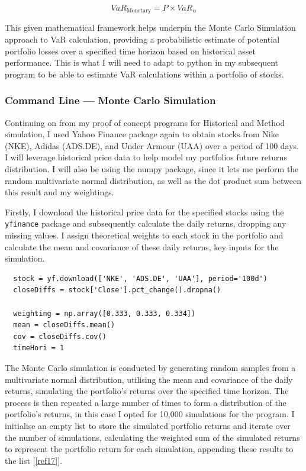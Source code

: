 \documentclass{article}
\begin{document}
\begin{equation}
    VaR_{\text{Monetary}} = P \times VaR_\alpha
\end{equation}

This given mathematical framework helps underpin the Monte Carlo Simulation approach to VaR calculation, providing a probabilistic estimate of potential portfolio losses over a specified time horizon based on historical asset performance. This is what I will need to adapt to python in my subsequent program to be able to estimate VaR calculations within a portfolio of stocks.

\subsubsection{Command Line --- Monte Carlo Simulation}

Continuing on from my proof of concept programs for Historical and Method simulation, I used Yahoo Finance package again to obtain stocks from Nike (NKE), Adidas (ADS.DE), and Under Armour (UAA) over a period of 100 days. I will leverage historical price data to help model my portfolios future returns distribution. I will also be using the numpy package, since it lets me perform the random multivariate normal distribution, as well as the dot product sum between this result and my weightings. \\\vspace{0.3cm}


Firstly, I download the historical price data for the specified stocks using the \texttt{yfinance} package and subsequently  calculate the daily returns, dropping any missing values. I assign theoretical weights to each stock in the portfolio and calculate the mean and covariance of these daily returns, key inputs for the simulation.\\\vspace{0.3cm}

\begin{verbatim}
  stock = yf.download(['NKE', 'ADS.DE', 'UAA'], period='100d')
  closeDiffs = stock['Close'].pct_change().dropna()

  weighting = np.array([0.333, 0.333, 0.334])
  mean = closeDiffs.mean()
  cov = closeDiffs.cov()
  timeHori = 1
\end{verbatim}

\vspace{0.3cm}
The Monte Carlo simulation is conducted by generating random samples from a multivariate normal distribution, utilising the mean and covariance of the daily returns, simulating the portfolio's returns over the specified time horizon. The process is then repeated a large number of times to form a distribution of the portfolio's returns, in this case I opted for 10,000 simulations for the program. I initialise an empty list to store the simulated portfolio returns and iterate over the number of simulations, calculating the weighted sum of the simulated returns to represent the portfolio return for each simulation, appending these results to the list [\ref{ref17}].\\\vspace{0.3cm}
\end{document}
